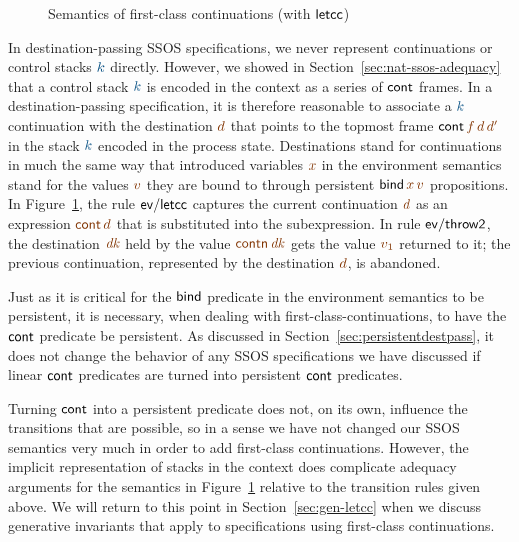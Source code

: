 \begin{figure}
\caption{Semantics of first-class continuations (with ${\sf letcc}$)}
\label{fig:dest-letcc}
\end{figure}


In destination-passing SSOS specifications, we never represent
continuations or control stacks $\obj{k}$ directly. However, we showed
in Section~\ref{sec:nat-ssos-adequacy} that a control stack $\obj{k}$
is encoded in the context as a series of ${\sf cont}$ frames. In a
destination-passing specification, it is therefore reasonable to
associate a $\obj{k}$ continuation with the destination $\lf{d}$ that
points to the topmost frame ${\sf cont}\,\lf{f}\,\lf{d}\,\lf{d'}$ in
the stack $\obj{k}$ encoded in the process state. Destinations 
stand for continuations in much the same way that introduced
variables $\lf{x}$ in the environment semantics stand for the values
$\lf{v}$ they are bound to through persistent ${\sf
  bind}\,\lf{x}\,\lf{v}$ propositions. In Figure~\ref{fig:dest-letcc},
the rule ${\sf ev/letcc}$ captures the current continuation $\lf{d}$
as an expression $\lf{{\sf cont}\,d}$ that is substituted into the
subexpression. In rule ${\sf ev/throw2}$, the destination $\lf{\it
  dk}$ held by the value $\lf{{\sf contn}\,{\it dk}}$ gets the value
$\lf{v_1}$ returned to it; the previous continuation, represented by
the destination $\lf{d}$, is abandoned.

Just as it is critical for the ${\sf bind}$ predicate in the
environment semantics to be persistent, it is necessary, when dealing
with first-class-continuations, to have the ${\sf cont}$ predicate be
persistent. As discussed in Section~\ref{sec:persistentdestpass}, it
does not change the behavior of any SSOS specifications we have
discussed if linear ${\sf cont}$ predicates are turned into persistent
${\sf cont}$ predicates.

Turning ${\sf cont}$ into a persistent predicate does not, on its own,
influence the transitions that are possible, so in a sense we have not
changed our SSOS semantics very much in order to add first-class
continuations. However, the implicit representation of stacks in the
context does complicate adequacy arguments for the semantics in
Figure~\ref{fig:dest-letcc} relative to the transition rules given
above. We will return to this point in Section~\ref{sec:gen-letcc}
when we discuss generative invariants that apply to specifications using
first-class continuations.
